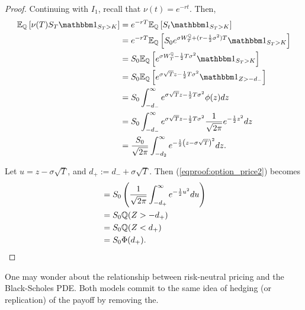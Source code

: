 \documentclass[../TGMAFFIRO.tex]{subfiles}
\begin{document}
\begin{proof}
	Continuing with $I_1$, recall that $\nu(t) = e^{-rt}$. Then,
	\begin{align}
		\ExpMeasure{\Qm}{\nu(T)S_T\ind_{S_T > K}} &= e^{-rT}\ExpMeasure{\Qm}{S_t\ind_{S_T > K}} \nonumber \\
		&= e^{-rT}\ExpMeasure{\Qm}{S_0e^{\sigma\QBm{T} + (r - \frac{1}{2}\sigma^2)T}\ind_{S_T > K}} \nonumber \\
		&= S_0 \ExpMeasure{\Qm}{e^{\sigma\QBm{T} - \frac{1}{2}T\sigma^2}\ind_{S_T > K}} \nonumber \\
		&= S_0 \ExpMeasure{\Qm}{e^{\sigma\sqrt{T}z - \frac{1}{2}T\sigma^2}\ind_{Z > -d_-}} \nonumber \\
		&= S_0\int_{-d_-}^\infty e^{\sigma\sqrt{T}z - \frac{1}{2}T\sigma^2} \phi(z) dz \nonumber \\
		&= S_0\int_{-d_-}^\infty e^{\sigma\sqrt{T}z - \frac{1}{2}T\sigma^2} \frac{1}{\sqrt{2\pi}} e^{-\frac{1}{2}z^2} dz \nonumber \\
		&= \frac{S_0}{\sqrt{2\pi}}\int_{-d_2}^{\infty}e^{-\frac{1}{2}\left(z - \sigma\sqrt{T}\right)^2} dz.\label{eqproof:option_price2}
	\end{align}
	
	Let $u = z - \sigma\sqrt{T}$, and $d_+ := d_- + \sigma\sqrt{T}$. Then (\ref{eqproof:option_price2}) becomes
	\begin{align}
		&=S_0\left(\frac{1}{\sqrt{2\pi}}\int_{-d_+}^{\infty} e^{-\frac{1}{2}u^2} du\right) \nonumber \\
		&= S_0\mathbb{Q}(Z > -d_+) \nonumber\\
		&= S_0\mathbb{Q}(Z < d_+) \nonumber \\
		&= S_0 \Phi(d_+).
	\end{align}
\end{proof}

One may wonder about the relationship between risk-neutral pricing and the Black-Scholes PDE. Both models commit to the same idea of hedging (or replication) of the payoff by removing the.

 
\end{document}
